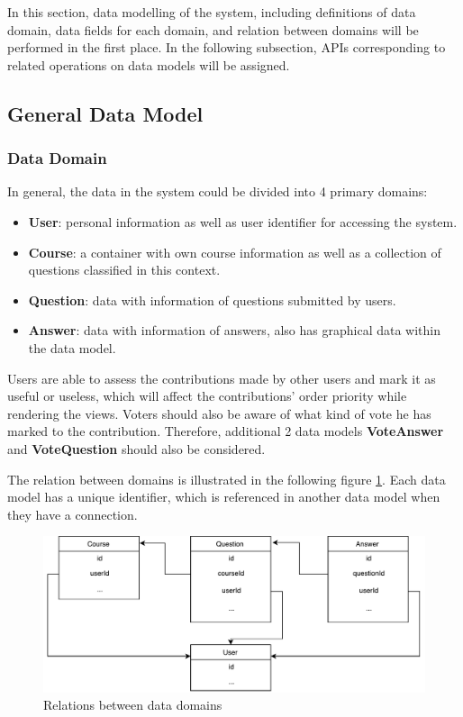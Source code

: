 In this section, data modelling of the system, including definitions of data domain, data fields for each domain, and relation between domains will be performed in the first place. In the following subsection, APIs corresponding to related operations on data models will be assigned.

\subsection{General Data Model}


\subsubsection{ Data Domain }
In general, the data in the system could be divided into 4 primary domains:

\begin{itemize}
\item
\textbf{User}: personal information as well as user identifier for accessing the system.
\item
\textbf{Course}: a container with own course information as well as a collection of questions classified in this context.
\item
\textbf{Question}:  data with information of questions submitted by users.
\item
\textbf{Answer}: data with information of answers, also has graphical data within the data model.

\end{itemize}

Users are able to assess the contributions made by other users and mark it as useful or useless, which will affect the contributions' order priority while rendering the views. Voters should also be aware of what kind of vote he has marked to the contribution. Therefore, additional 2 data models \textbf{VoteAnswer} and \textbf{VoteQuestion} should also be considered. 

The relation between domains is illustrated in the following figure \ref{fig:data-domain-relation}. Each data model has a unique identifier, which is referenced in another data model when they have a connection. 

\begin{figure}[!htbp]
  \centering
    \includegraphics[width=1\textwidth]{Figures/concept-data-domain-relation.pdf}
  \caption{Relations between data domains}
  \label{fig:data-domain-relation}
\end{figure}


